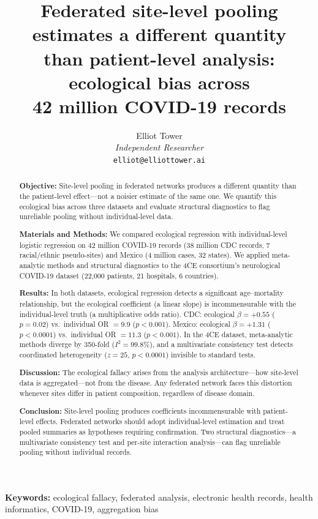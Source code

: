 \documentclass[11pt]{article}
\title{Federated site-level pooling estimates a different quantity\\than patient-level analysis: ecological bias across\\42 million COVID-19 records}
\author{Elliot Tower\\
\textit{Independent Researcher}\\
\texttt{elliot@elliottower.ai}}
\date{}
\begin{document}
\maketitle

\begin{abstract}
\noindent\textbf{Objective:}
Site-level pooling in federated networks produces a different quantity
than the patient-level effect---not a noisier estimate of the same one.
We quantify this ecological bias across three datasets and evaluate
structural diagnostics to flag unreliable pooling without
individual-level data.

\noindent\textbf{Materials and Methods:}
We compared ecological regression with individual-level
logistic regression on 42 million COVID-19 records
(38 million CDC records, 7 racial/ethnic pseudo-sites) and Mexico
(4 million cases, 32 states).  We applied meta-analytic methods
and structural diagnostics to the 4CE consortium's neurological COVID-19
dataset (22,000 patients, 21 hospitals, 6 countries).

\noindent\textbf{Results:}
In both datasets, ecological regression detects a significant age--mortality
relationship, but the ecological coefficient (a linear slope)
is incommensurable with the individual-level truth (a multiplicative odds
ratio).  CDC: ecological $\beta = +0.55$ ($p = 0.02$) vs.\ individual
OR $= 9.9$ ($p < 0.001$).  Mexico: ecological $\beta = +1.31$
($p < 0.0001$) vs.\ individual OR $= 11.3$ ($p < 0.001$).  In the 4CE
dataset, meta-analytic methods diverge by 350-fold ($I^2 = 99.8\%$), and
a multivariate consistency test detects coordinated heterogeneity
($z = 25$, $p < 0.0001$) invisible to standard tests.

\noindent\textbf{Discussion:}
The ecological fallacy arises from the analysis architecture---how
site-level data is aggregated---not from the disease.
Any federated network faces this distortion whenever sites differ in
patient composition, regardless of disease domain.

\noindent\textbf{Conclusion:}
Site-level pooling produces coefficients incommensurable with
patient-level effects.  Federated networks should adopt individual-level
estimation and treat pooled summaries as hypotheses
requiring confirmation.  Two structural
diagnostics---a multivariate consistency test and per-site interaction
analysis---can flag unreliable pooling without individual records.
\end{abstract}

\noindent\textbf{Keywords:} ecological fallacy, federated analysis,
electronic health records, health informatics, COVID-19, aggregation bias
\end{document}
